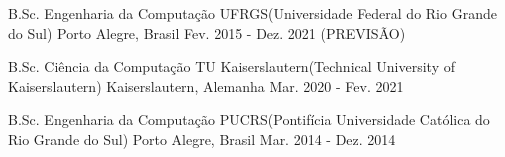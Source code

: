 
\begin{cventries}
    \cvcompactentry
    {B.Sc. Engenharia da Computação} %
    {UFRGS(Universidade Federal do Rio Grande do Sul)} %
    {Porto Alegre, Brasil} %
    {Fev. 2015 - Dez. 2021 (PREVISÃO)} %

    \cvcompactentry
    {B.Sc. Ciência da Computação} %
    {TU Kaiserslautern(Technical University of Kaiserslautern)} %
    {Kaiserslautern, Alemanha} %
    {Mar. 2020 - Fev. 2021} %

    \cvcompactentry
    {B.Sc. Engenharia da Computação} %
    {PUCRS(Pontifícia Universidade Católica do Rio Grande do Sul)} %
    {Porto Alegre, Brasil} %
    {Mar. 2014 - Dez. 2014} %
\end{cventries}
